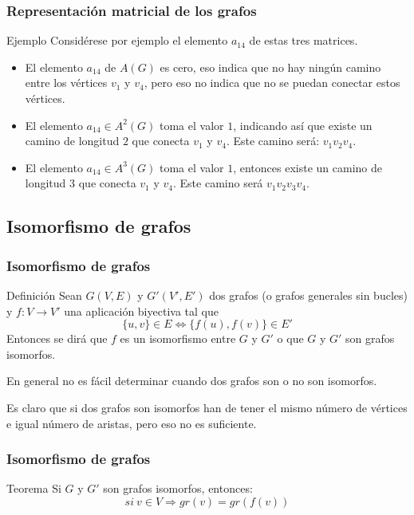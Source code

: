 \documentclass{beamer}
\begin{document}
\begin{frame}
\frametitle{Representaci\'on matricial de los grafos}
\begin{block}{Ejemplo}
Consid\'erese por ejemplo el elemento $a_{14}$ de estas tres matrices. 
\begin{itemize}
\item El elemento $a_{14}$ de $A(G)$ es cero, eso indica que no hay ning\'un camino entre los v\'ertices $v_1$ y $v_4$, pero eso no indica que no se puedan conectar estos v\'ertices.

\item El elemento $a_{14} \in A^2(G)$ toma el valor $1$, indicando as\'i que existe un camino de longitud $2$ que conecta $v_1$ y $v_4$. Este camino ser\'a:
 $v_1v_2v_4$.

\item El elemento $a_{14}\in A^3(G)$ toma el valor $1$, entonces existe un camino de longitud $3$ que conecta $v_1$ y $v_4$. Este camino ser\'a $v_1v_2v_3v_4$.
\end{itemize}
\end{block}
\end{frame}

\subsection{Isomorfismo de grafos}

\begin{frame}
\frametitle{Isomorfismo de grafos}
\begin{block}{Definici\'on}
Sean $G(V,E)$ y $G'(V',E')$ dos grafos (o grafos generales sin bucles) y $f:V\longrightarrow V'$ una aplicaci\'on biyectiva tal que \[\{u,v\}\in E \Longleftrightarrow \{f(u),f(v)\}\in E'\]
Entonces se dir\'a que $f$ es un isomorfismo entre $G$ y $G'$ o que $G$ y $G'$ son grafos isomorfos. 
\end{block}
En general no es f\'acil determinar cuando dos grafos son o no son isomorfos.

Es claro que si dos grafos son isomorfos han de tener el mismo n\'umero de v\'ertices e igual n\'umero de aristas, pero eso no es suficiente. 
\end{frame}

\begin{frame}
\frametitle{Isomorfismo de grafos}
\begin{block}{Teorema}
Si $G$ y $G'$ son grafos isomorfos, entonces:
\[si\ v\in V \Longrightarrow gr(v) = gr(f(v))\]
\end{block}
\end{frame}
\end{document}

